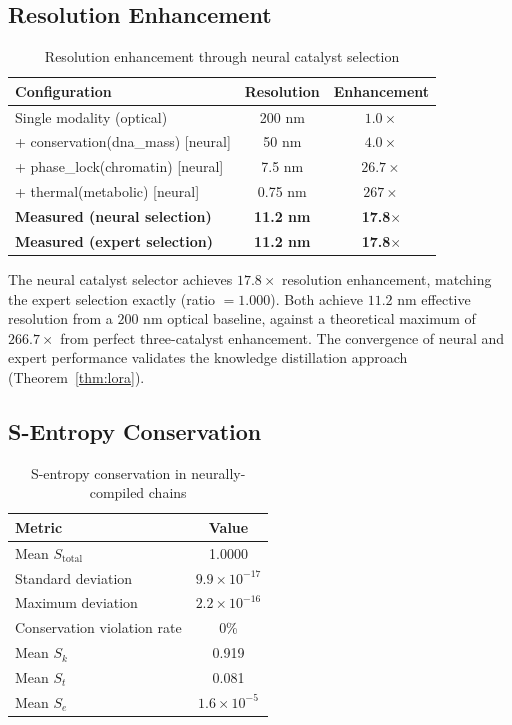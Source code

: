 \documentclass[11pt,twocolumn,a4paper]{article}
\theoremstyle{definition}
\theoremstyle{remark}
\begin{document}
\subsection{Resolution Enhancement}

\begin{table}[H]
\centering
\caption{Resolution enhancement through neural catalyst selection}
\label{tab:resolution}
\begin{tabular}{@{}lcc@{}}
\toprule
Configuration & Resolution & Enhancement \\
\midrule
Single modality (optical) & 200 nm & $1.0\times$ \\
+ conservation(dna\_mass) [neural] & 50 nm & $4.0\times$ \\
+ phase\_lock(chromatin) [neural] & 7.5 nm & $26.7\times$ \\
+ thermal(metabolic) [neural] & 0.75 nm & $267\times$ \\
\midrule
\textbf{Measured (neural selection)} & \textbf{11.2 nm} & \textbf{17.8$\times$} \\
\textbf{Measured (expert selection)} & \textbf{11.2 nm} & \textbf{17.8$\times$} \\
\bottomrule
\end{tabular}
\end{table}

The neural catalyst selector achieves $17.8\times$ resolution enhancement, matching the expert selection exactly (ratio $= 1.000$). Both achieve $11.2$ nm effective resolution from a $200$ nm optical baseline, against a theoretical maximum of $266.7\times$ from perfect three-catalyst enhancement. The convergence of neural and expert performance validates the knowledge distillation approach (Theorem~\ref{thm:lora}).

\subsection{S-Entropy Conservation}

\begin{table}[H]
\centering
\caption{S-entropy conservation in neurally-compiled chains}
\label{tab:entropy}
\begin{tabular}{@{}lc@{}}
\toprule
Metric & Value \\
\midrule
Mean $S_{\text{total}}$ & 1.0000 \\
Standard deviation & $9.9 \times 10^{-17}$ \\
Maximum deviation & $2.2 \times 10^{-16}$ \\
Conservation violation rate & 0\% \\
Mean $S_k$ & 0.919 \\
Mean $S_t$ & 0.081 \\
Mean $S_e$ & $1.6 \times 10^{-5}$ \\
\bottomrule
\end{tabular}
\end{table}
\end{document}
